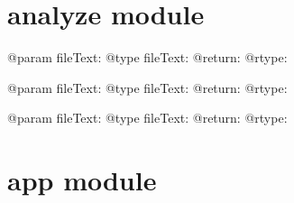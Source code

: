 \documentclass[letterpaper,10pt,english]{sphinxmanual}
\begin{document}
\chapter{analyze module}
\label{\detokenize{analyze:module-analyze}}\label{\detokenize{analyze::doc}}\label{\detokenize{analyze:analyze-module}}

\begin{fulllineitems}
\label{\detokenize{analyze:analyze.analyzeText}}
\end{fulllineitems}


\begin{fulllineitems}
\label{\detokenize{analyze:analyze.checkSimilarity}}
@param fileText:
@type fileText:
@return:
@rtype:

\end{fulllineitems}


\begin{fulllineitems}
\label{\detokenize{analyze:analyze.createObjects}}
@param fileText:
@type fileText:
@return:
@rtype:

\end{fulllineitems}


\begin{fulllineitems}
\label{\detokenize{analyze:analyze.scrapeText}}
@param fileText:
@type fileText:
@return:
@rtype:

\end{fulllineitems}



\chapter{app module}
\label{\detokenize{app::doc}}\label{\detokenize{app:module-app}}\label{\detokenize{app:app-module}}
\end{document}
